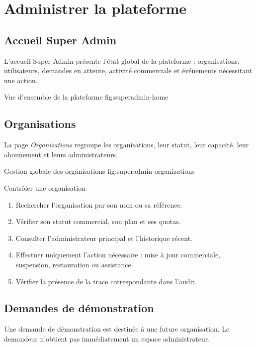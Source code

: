 \chapter{Administrer la plateforme}

\section{Accueil Super Admin}

L'accueil Super Admin présente l'état global de la plateforme : organisations,
utilisateurs, demandes en attente, activité commerciale et événements
nécessitant une action.

  {Vue d'ensemble de la plateforme}
  {fig:superadmin-home}

\section{Organisations}

La page \emph{Organizations} regroupe les organisations, leur statut, leur
capacité, leur abonnement et leurs administrateurs.

  {Gestion globale des organisations}
  {fig:superadmin-organizations}

\begin{procedurebox}{Contrôler une organisation}
  \begin{enumerate}[leftmargin=*]
    \item Rechercher l'organisation par son nom ou sa référence.
    \item Vérifier son statut commercial, son plan et ses quotas.
    \item Consulter l'administrateur principal et l'historique récent.
    \item Effectuer uniquement l'action nécessaire : mise à jour commerciale,
    suspension, restauration ou assistance.
    \item Vérifier la présence de la trace correspondante dans l'audit.
  \end{enumerate}
\end{procedurebox}

\section{Demandes de démonstration}

Une demande de démonstration est destinée à une future organisation. Le
demandeur n'obtient pas immédiatement un espace administrateur.


